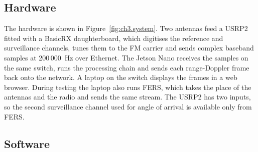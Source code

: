 
\begin{figure}[H]
    \centering
    \caption[TODO]{}
    \label{fig:ch3.system}
    \label{fig:ch3.hardware}
    \label{fig:ch3.software}
    \label{fig:ch3.chain}
\end{figure}

\subsection{Hardware}
\label{subsec:ch3.architecture.hardware}
\label{sec:ch3.frontend}
\label{sec:ch3.gui}

The hardware is shown in Figure~\ref{fig:ch3.system}. Two antennas feed a USRP2 fitted with a BasicRX daughterboard, which digitises the reference and surveillance channels, tunes them to the FM carrier and sends complex baseband samples at 200\,000~Hz over Ethernet. The Jetson Nano receives the samples on the same switch, runs the processing chain and sends each range-Doppler frame back onto the network. A laptop on the switch displays the frames in a web browser. During testing the laptop also runs FERS, which takes the place of the antennas and the radio and sends the same stream. The USRP2 has two inputs, so the second surveillance channel used for angle of arrival is available only from FERS. 

\subsection{Software}
\label{subsec:ch3.architecture.software}
\label{subsec:ch3.architecture.chain}
\label{subsec:ch3.dataflow.faults}

